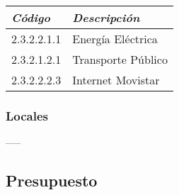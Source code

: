         \begin{table}[h!]
            \centering
            \begin{tabular}{|p{3cm}|p{5cm}|} \hline
                 
            
            \textit{{\bf{Código}}} &
            \textit{{\bf{Descripción}}}
            \\ \hline

            2.3.2.2.1.1 &
            Energía Eléctrica
            \\ \hline

            2.3.2.1.2.1 &
            Transporte Público
            \\ \hline

            2.3.2.2.2.3 &
            Internet Movistar
            \\ \hline

            \end{tabular}
        \end{table}


    \subsubsection{Locales}

    -----

    \subsection{Presupuesto}
